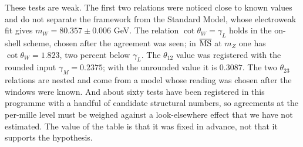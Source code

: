 These tests are weak.  The first two relations were noticed close to known values and do not separate the framework from the Standard
Model, whose electroweak fit gives \(m_W=80.357\pm0.006\) GeV.  The relation \(\cot\theta_W=\gamma_L\) holds in the on-shell scheme, chosen after the
agreement was seen; in \(\overline{\rm MS}\) at \(m_Z\) one has \(\cot\theta_W=1.823\), two percent below \(\gamma_L\).  The \(\theta_{12}\) value was registered with
the rounded input \(\gamma_M=0.2375\); with the unrounded value it is \(0.3087\).  The two \(\theta_{23}\) relations are nested and come from a model
whose reading was chosen after the windows were known.  And about sixty tests have been registered in this programme with a handful of
candidate structural numbers, so agreements at the per-mille level must be weighed against a look-elsewhere effect that we have not
estimated.  The value of the table is that it was fixed in advance, not that it supports the hypothesis.
